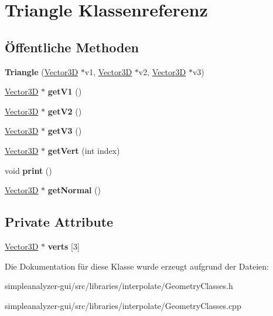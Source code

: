 \hypertarget{classTriangle}{\section{Triangle Klassenreferenz}
\label{classTriangle}
}
\subsection*{Öffentliche Methoden}
\begin{DoxyCompactItemize}
\item 
\hypertarget{classTriangle_aa25e2e56ac291e4366474fcbdcc6901b}{{\bfseries Triangle} (\hyperlink{classVector3D}{Vector3\-D} $\ast$v1, \hyperlink{classVector3D}{Vector3\-D} $\ast$v2, \hyperlink{classVector3D}{Vector3\-D} $\ast$v3)}\label{classTriangle_aa25e2e56ac291e4366474fcbdcc6901b}

\item 
\hypertarget{classTriangle_ae054a0eae5dae026c5af69274c5f277e}{\hyperlink{classVector3D}{Vector3\-D} $\ast$ {\bfseries get\-V1} ()}\label{classTriangle_ae054a0eae5dae026c5af69274c5f277e}

\item 
\hypertarget{classTriangle_a6de5f8560482f4130bdbb96b25aa1b58}{\hyperlink{classVector3D}{Vector3\-D} $\ast$ {\bfseries get\-V2} ()}\label{classTriangle_a6de5f8560482f4130bdbb96b25aa1b58}

\item 
\hypertarget{classTriangle_a792a627dc42adad87c0b30e16a6b5824}{\hyperlink{classVector3D}{Vector3\-D} $\ast$ {\bfseries get\-V3} ()}\label{classTriangle_a792a627dc42adad87c0b30e16a6b5824}

\item 
\hypertarget{classTriangle_a9320d1ab83c104352bf5e8f2c8274334}{\hyperlink{classVector3D}{Vector3\-D} $\ast$ {\bfseries get\-Vert} (int index)}\label{classTriangle_a9320d1ab83c104352bf5e8f2c8274334}

\item 
\hypertarget{classTriangle_abc3785b96e03fde1b5f594f8ed6afabb}{void {\bfseries print} ()}\label{classTriangle_abc3785b96e03fde1b5f594f8ed6afabb}

\item 
\hypertarget{classTriangle_a3c72b19f316fa9ffb0a2f206e3558790}{\hyperlink{classVector3D}{Vector3\-D} $\ast$ {\bfseries get\-Normal} ()}\label{classTriangle_a3c72b19f316fa9ffb0a2f206e3558790}

\end{DoxyCompactItemize}
\subsection*{Private Attribute}
\begin{DoxyCompactItemize}
\item 
\hypertarget{classTriangle_aa5ac3f568e42e746f7bd8be658e50060}{\hyperlink{classVector3D}{Vector3\-D} $\ast$ {\bfseries verts} \mbox{[}3\mbox{]}}\label{classTriangle_aa5ac3f568e42e746f7bd8be658e50060}

\end{DoxyCompactItemize}


Die Dokumentation für diese Klasse wurde erzeugt aufgrund der Dateien\-:\begin{DoxyCompactItemize}
\item 
simpleanalyzer-\/gui/src/libraries/interpolate/Geometry\-Classes.\-h\item 
simpleanalyzer-\/gui/src/libraries/interpolate/Geometry\-Classes.\-cpp\end{DoxyCompactItemize}
